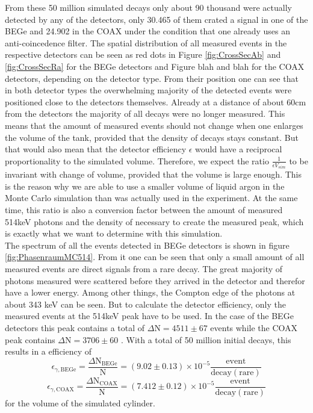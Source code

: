 \documentclass[encoding=utf8,british]{tumphthesis}
\begin{document}
From these 50 million simulated decays only about 90 thousand were actually detected by any of the detectors, only 30.465 of them crated a signal in one of the BEGe and 24.902 in the COAX under the condition that one already uses an anti-coincedence filter.
The spatial distribution of all measured events in the respective detectors can be seen as red dots in Figure \ref{fig:CrossSecAb} and \ref{fig:CrossSecRa} for the BEGe detectors and Figure blah and blah for the COAX detectors, depending on the detector type.
From their position one can see that in both detector types the overwhelming majority of the detected events were positioned close to the detectors themselves.
Already at a distance of about 60cm from the detectors the majority of all decays were no longer measured.
This means that the amount of measured events should not change when one enlarges the volume of the tank, provided that the density of decays stays constant.
But that would also mean that the detector efficiency $\epsilon$ would have a reciprocal proportionality to the simulated volume.
Therefore, we expect the ratio $\frac{1}{\epsilon V_{sim}}$ to be invariant with change of volume, provided that the volume is large enough.   
This is the reason why we are able to use a smaller volume of liquid argon in the Monte Carlo simulation than was actually used in the experiment.
At the same time, this ratio is also a conversion factor between the amount of measured 514keV photons and the density of \Kr necessary to create the measured peak, which is exactly what we want to determine with this simulation.
\\

The spectrum of all the events detected in BEGe detectors is shown in figure \ref{fig:PhasenraumMC514}.
From it one can be seen that only a small amount of all measured events are direct signals from a rare \Kr decay. 
The great majority of photons measured were scattered before they arrived in the detector and therefor have a lower energy.
Among other things, the Compton edge of the photons at about 343 keV can be seen.
But to calculate the detector efficiency, only the measured events at the 514keV peak have to be used.
In the case of the BEGe detectors this peak contains a total of \(\Delta\mathrm{N} = 4511\pm67\) events while the COAX peak contains  \(\Delta\mathrm{N} = 3706\pm60\) .
With a total of 50 million initial decays, this results in a efficiency of 
\begin{equation*}
\epsilon_{\gamma\mathrm{,BEGe}} = \frac{\Delta\mathrm{N_{BEGe}}}{\mathrm{N}} = (9.02\pm0.13) \times 10^{-5}  \frac{\mathrm{event}}{\mathrm{decay(rare)}}
\end{equation*}
\begin{equation*}
\epsilon_{\gamma\mathrm{,COAX}} = \frac{\Delta\mathrm{N_{COAX}}}{\mathrm{N}} = (7.412\pm0.12) \times 10^{-5}  \frac{\mathrm{event}}{\mathrm{decay(rare)}}
\end{equation*}
for the volume of the simulated cylinder.
\\
\end{document}

